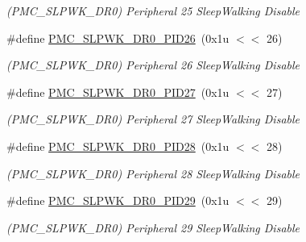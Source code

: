 \begin{DoxyCompactItemize}
\begin{DoxyCompactList}\small\item\em (P\+M\+C\+\_\+\+S\+L\+P\+W\+K\+\_\+\+D\+R0) Peripheral 25 Sleep\+Walking Disable \end{DoxyCompactList}\item 
\mbox{\label{group__SAMV71__PMC_gac30ab55e859fff38f4d947cbbe2ede8a}} 
\#define \mbox{\hyperlink{group__SAMV71__PMC_gac30ab55e859fff38f4d947cbbe2ede8a}{P\+M\+C\+\_\+\+S\+L\+P\+W\+K\+\_\+\+D\+R0\+\_\+\+P\+I\+D26}}~(0x1u $<$$<$ 26)
\begin{DoxyCompactList}\small\item\em (P\+M\+C\+\_\+\+S\+L\+P\+W\+K\+\_\+\+D\+R0) Peripheral 26 Sleep\+Walking Disable \end{DoxyCompactList}\item 
\mbox{\label{group__SAMV71__PMC_gac05c9ac4acc0d89d111dad66b29678ad}} 
\#define \mbox{\hyperlink{group__SAMV71__PMC_gac05c9ac4acc0d89d111dad66b29678ad}{P\+M\+C\+\_\+\+S\+L\+P\+W\+K\+\_\+\+D\+R0\+\_\+\+P\+I\+D27}}~(0x1u $<$$<$ 27)
\begin{DoxyCompactList}\small\item\em (P\+M\+C\+\_\+\+S\+L\+P\+W\+K\+\_\+\+D\+R0) Peripheral 27 Sleep\+Walking Disable \end{DoxyCompactList}\item 
\mbox{\label{group__SAMV71__PMC_ga101ebe9b346860a4308e825640c16ae0}} 
\#define \mbox{\hyperlink{group__SAMV71__PMC_ga101ebe9b346860a4308e825640c16ae0}{P\+M\+C\+\_\+\+S\+L\+P\+W\+K\+\_\+\+D\+R0\+\_\+\+P\+I\+D28}}~(0x1u $<$$<$ 28)
\begin{DoxyCompactList}\small\item\em (P\+M\+C\+\_\+\+S\+L\+P\+W\+K\+\_\+\+D\+R0) Peripheral 28 Sleep\+Walking Disable \end{DoxyCompactList}\item 
\mbox{\label{group__SAMV71__PMC_gabbf17fd219ae47df8d9adfc09818b8ff}} 
\#define \mbox{\hyperlink{group__SAMV71__PMC_gabbf17fd219ae47df8d9adfc09818b8ff}{P\+M\+C\+\_\+\+S\+L\+P\+W\+K\+\_\+\+D\+R0\+\_\+\+P\+I\+D29}}~(0x1u $<$$<$ 29)
\begin{DoxyCompactList}\small\item\em (P\+M\+C\+\_\+\+S\+L\+P\+W\+K\+\_\+\+D\+R0) Peripheral 29 Sleep\+Walking Disable \end{DoxyCompactList}\item 

\end{DoxyCompactItemize}
